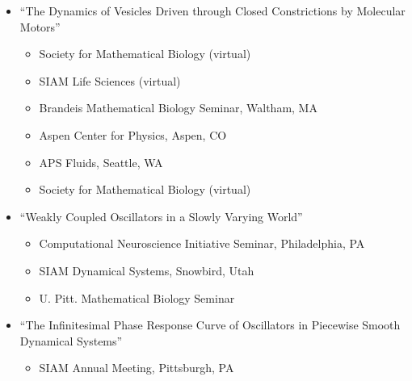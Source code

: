 \documentclass[a4paper,10pt]{article}
\begin{document}
\begin{itemize}[leftmargin=.225in,rightmargin=.1in]
\begin{itemize}
    \end{itemize}
    \item ``The Dynamics of Vesicles Driven through Closed Constrictions by Molecular Motors''
    \begin{itemize}
        \item { Society for Mathematical Biology (virtual)}
        \item { SIAM Life Sciences (virtual)}
        \item { Brandeis Mathematical Biology Seminar, Waltham, MA}
        \item { Aspen Center for Physics, Aspen, CO}
        \item { APS Fluids, Seattle, WA}
        \item { Society for Mathematical Biology (virtual)}
    \end{itemize}
    \item ``Weakly Coupled Oscillators in a Slowly Varying World''
    \begin{itemize}
         \item { Computational Neuroscience Initiative Seminar, Philadelphia, PA}
         \item { SIAM Dynamical Systems, Snowbird, Utah}
         \item { U. Pitt. Mathematical Biology Seminar}
    \end{itemize}
    \item  ``The Infinitesimal Phase Response Curve of Oscillators in Piecewise Smooth Dynamical Systems''
    \begin{itemize}
        \item { SIAM Annual Meeting, Pittsburgh, PA}
    \end{itemize}
\end{itemize}
\end{document}

